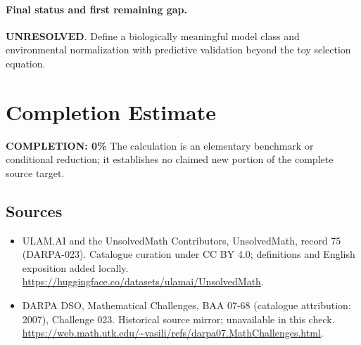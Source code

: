 \documentclass[11pt]{article}
\begin{document}
\paragraph{Final status and first remaining gap.}
\textbf{UNRESOLVED}. Define a biologically meaningful model class and environmental normalization with predictive validation beyond the toy selection equation.

\section{Completion Estimate}
\noindent\textbf{COMPLETION: 0\%}
The calculation is an elementary benchmark or conditional reduction; it establishes no claimed new portion of the complete source target.

\subsection{Sources}
\begin{itemize}
\item[\hypertarget{source:75:1}{S1}] ULAM.AI and the UnsolvedMath Contributors, UnsolvedMath, record 75 (DARPA-023). Catalogue curation under CC BY 4.0; definitions and English exposition added locally.
\url{https://huggingface.co/datasets/ulamai/UnsolvedMath}.
\item[\hypertarget{source:75:2}{S2}] DARPA DSO, Mathematical Challenges, BAA 07-68 (catalogue attribution: 2007), Challenge 023. Historical source mirror; unavailable in this check.
\url{https://web.math.utk.edu/~vasili/refs/darpa07.MathChallenges.html}.
\end{itemize}
\label{end:75}
\end{document}
